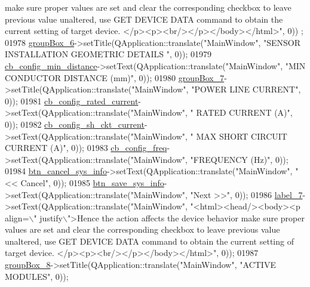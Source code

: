 \begin{DoxyCode}
{       make sure proper values are set and clear the corresponding checkbox to leave previous value unaltered, use
       GET DEVICE DATA command to obtain the current setting of target device. </p><p><br/></p></body></html>"}, 0))
      ;
01978         \hyperlink{a00080_a40a9931365fd3679efec4f0112073db2}{groupBox\_6}->setTitle(QApplication::translate(\textcolor{stringliteral}{"MainWindow"}, \textcolor{stringliteral}{"SENSOR INSTALLATION GEOMETRIC
       DETAILS "}, 0));
01979         \hyperlink{a00080_a6b0d09f3b380fdb810d3da3f5208ccf5}{cb\_config\_min\_distance}->setText(QApplication::translate(\textcolor{stringliteral}{"MainWindow"}, \textcolor{stringliteral}{"MIN
       CONDUCTOR DISTANCE (mm)"}, 0));
01980         \hyperlink{a00080_a269faaef68e4ad4784635810fcae5698}{groupBox\_7}->setTitle(QApplication::translate(\textcolor{stringliteral}{"MainWindow"}, \textcolor{stringliteral}{"POWER LINE CURRENT"}, 0));
01981         \hyperlink{a00080_af4863849ff58931ae3a38aa5b40b8158}{cb\_config\_rated\_current}->setText(QApplication::translate(\textcolor{stringliteral}{"MainWindow"}, \textcolor{stringliteral}{"
      RATED CURRENT (A)"}, 0));
01982         \hyperlink{a00080_a541de6e510677e572ab233f7ecc25e2c}{cb\_config\_sh\_ckt\_current}->setText(QApplication::translate(\textcolor{stringliteral}{"MainWindow"}, \textcolor{stringliteral}{"
      MAX SHORT CIRCUIT CURRENT (A)"}, 0));
01983         \hyperlink{a00080_a8f501acefacd6343a4ec99a67172f256}{cb\_config\_freq}->setText(QApplication::translate(\textcolor{stringliteral}{"MainWindow"}, \textcolor{stringliteral}{"FREQUENCY (Hz)"}, 0));
01984         \hyperlink{a00080_a72415fe77c8f6eb7b13d16177a14b39a}{btn\_cancel\_sys\_info}->setText(QApplication::translate(\textcolor{stringliteral}{"MainWindow"}, \textcolor{stringliteral}{"<< Cancel"}, 
      0));
01985         \hyperlink{a00080_a5ccef61fb3372e70d59a662f4fde5db3}{btn\_save\_sys\_info}->setText(QApplication::translate(\textcolor{stringliteral}{"MainWindow"}, \textcolor{stringliteral}{"Next >>"}, 0));
01986         \hyperlink{a00080_a13936e6f18b1c90402b3c7a3c92b6cdb}{label\_7}->setText(QApplication::translate(\textcolor{stringliteral}{"MainWindow"}, \textcolor{stringliteral}{"<html><head/><body><p align=\(\backslash\)"
      justify\(\backslash\)">Hence the action affects the device behavior make sure proper values are set and clear the corresponding
       checkbox to leave previous value unaltered, use GET DEVICE DATA command to obtain the current setting of
       target device. </p><p><br/></p></body></html>"}, 0));
01987         \hyperlink{a00080_a1a1fe5ec77ba52ba39a16db29ff0f91a}{groupBox\_8}->setTitle(QApplication::translate(\textcolor{stringliteral}{"MainWindow"}, \textcolor{stringliteral}{"ACTIVE MODULES"}, 0));

\end{DoxyCode}
